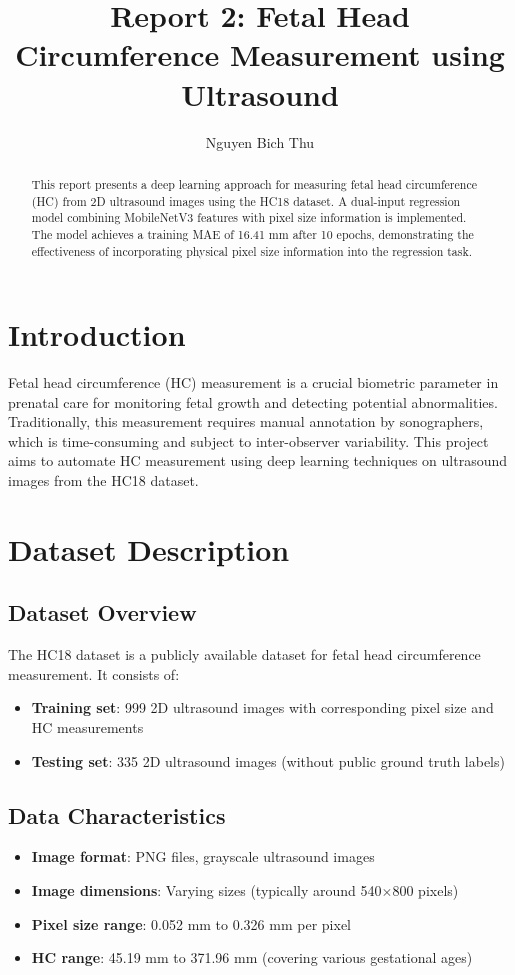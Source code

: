 \documentclass{article}
\title{Report 2: Fetal Head Circumference Measurement using Ultrasound}
\author{Nguyen Bich Thu}
\date{}
\begin{document}
\maketitle

\begin{abstract}
This report presents a deep learning approach for measuring fetal head circumference (HC) from 2D ultrasound images using the HC18 dataset. A dual-input regression model combining MobileNetV3 features with pixel size information is implemented. The model achieves a training MAE of 16.41 mm after 10 epochs, demonstrating the effectiveness of incorporating physical pixel size information into the regression task.
\end{abstract}

\section{Introduction}
Fetal head circumference (HC) measurement is a crucial biometric parameter in prenatal care for monitoring fetal growth and detecting potential abnormalities. Traditionally, this measurement requires manual annotation by sonographers, which is time-consuming and subject to inter-observer variability. This project aims to automate HC measurement using deep learning techniques on ultrasound images from the HC18 dataset.

\section{Dataset Description}
\subsection{Dataset Overview}
The HC18 dataset \cite{van2018hc18} is a publicly available dataset for fetal head circumference measurement. It consists of:
\begin{itemize}
    \item \textbf{Training set}: 999 2D ultrasound images with corresponding pixel size and HC measurements
    \item \textbf{Testing set}: 335 2D ultrasound images (without public ground truth labels)
\end{itemize}

\subsection{Data Characteristics}
\begin{itemize}
    \item \textbf{Image format}: PNG files, grayscale ultrasound images
    \item \textbf{Image dimensions}: Varying sizes (typically around 540$\times$800 pixels)
    \item \textbf{Pixel size range}: 0.052 mm to 0.326 mm per pixel
    \item \textbf{HC range}: 45.19 mm to 371.96 mm (covering various gestational ages)
\end{itemize}
\end{document}
